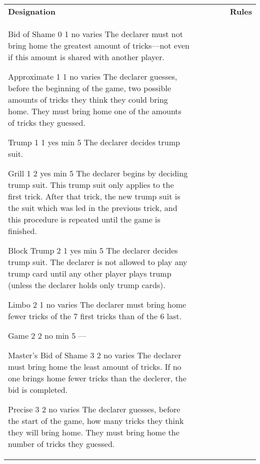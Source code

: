 	\begin{center}
		\begin{tabularx}{\textwidth}{
				l
				S[table-number-alignment=center, table-format=1.0]
				S[table-number-alignment=center, table-format=1.0]
				cc|X
			}

			\textbf{Designation} &
			 &
			 &
			 &
			 &
			\textbf{Rules}
			\\[-3ex]

			\standardBidItem%
			{Bid of Shame}
			{0}
			{1}
			{no}
			{varies}
			{%
				The declarer must not bring home the greatest amount of tricks---not even if this amount is shared with another player.
			}

			\standardBidItem%
			{Approximate}
			{1}
			{1}
			{no}
			{varies}
			{%
				The declarer guesses, before the beginning of the game, two possible amounts of tricks they think they could bring home. They must bring home one of the amounts of tricks they guessed.
			}

			\standardBidItem%
			{Trump}
			{1}
			{1}
			{yes}
			{min 5}
			{%
				The declarer decides trump suit.
			}

			\standardBidItem%
			{Grill}
			{1}
			{2}
			{yes}
			{min 5}
			{%
				The declarer begins by deciding trump suit. This trump suit only applies to the first trick. After that trick, the new trump suit is the suit which was led in the previous trick, and this procedure is repeated until the game is finished.
			}

			\standardBidItem%
			{Block Trump}
			{2}
			{1}
			{yes}
			{min 5}
			{%
				The declarer decides trump suit. The declarer is not allowed to play any trump card until any other player plays trump (unless the declarer holds only trump cards).
			}
			
			\standardBidItem%
			{Limbo}
			{2}
			{1}
			{no}
			{varies}
			{%
				The declarer must bring home fewer tricks of the 7 first tricks than of the 6 last.
			}
			
			\standardBidItem%
			{Game}
			{2}
			{2}
			{no}
			{min 5}
			{%
				---
			}

			\standardBidItem%
			{Master's Bid of Shame}
			{3}
			{2}
			{no}
			{varies}
			{%
				The declarer must bring home the least amount of tricks. If no one brings home fewer tricks than the declerer, the bid is completed.
			}

			\standardBidItem%
			{Precise}
			{3}
			{2}
			{no}
			{varies}
			{%
				The declarer guesses, before the start of the game, how many tricks they think they will bring home. They must bring home the number of tricks they guessed.
			}


\end{tabularx}
\end{center}
